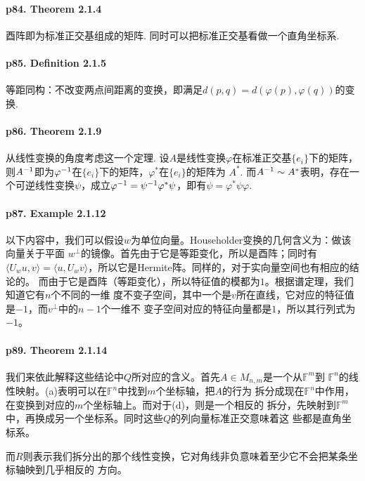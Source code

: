   \paragraph{p84. Theorem 2.1.4}
    酉阵即为标准正交基组成的矩阵. 同时可以把标准正交基看做一个直角坐标系. 

  \paragraph{p85. Definition 2.1.5}
    等距同构：不改变两点间距离的变换，即满足$d(p,q) =d(\varphi(p), \varphi(q))$的变换.

  \paragraph{p86. Theorem 2.1.9}
    从线性变换的角度考虑这一个定理. 设$A$是线性变换$\varphi$在标准正交基$\{e_i\}$下的矩阵，
    则$A^{-1}$即为$\varphi^{-1}$在$\{e_i\}$下的矩阵，$\varphi^*$在$\{e_i\}$的矩阵为
    $A^*$. 而$A^{-1}\sim A^*$表明，存在一个可逆线性变换$\psi$，成立$\varphi^{-1}=\psi
    ^{-1}\varphi^*\psi$，即有$\psi=\varphi^*\psi\varphi$. 

  \paragraph{p87. Example 2.1.12}
    以下内容中，我们可以假设$w$为单位向量。Householder变换的几何含义为：做该向量关于平面
    $w^\perp$的镜像。首先由于它是等距变化，所以是酉阵；同时有$\langle U_wu,v\rangle = 
    \langle u,U_wv\rangle$，所以它是Hermite阵。同样的，对于实向量空间也有相应的结论的。
    而由于它是酉阵（等距变化），所以特征值的模都为$1$。根据谱定理，我们知道它有$n$个不同的一维
    度不变子空间，其中一个是$v$所在直线，它对应的特征值是$-1$，而$v^\perp$中的$n-1$个一维不
    变子空间对应的特征向量都是$1$，所以其行列式为$-1$。

  \paragraph{p89. Theorem 2.1.14}
    我们来依此解释这些结论中$Q$所对应的含义。首先$A\in M_{n,m}$是一个从$\mathbb{F}^m$到
    $\mathbb{F}^n$的线性映射。(a)表明可以在$\mathbb{F}^n$中找到$m$个坐标轴，把$A$的行为
    拆分成现在$\mathbb{F}^n$中作用，在变换到对应的$m$个坐标轴上。而对于(d)，则是一个相反的
    拆分，先映射到$\mathbb{F}^m$中，再换成另一个坐标系。同时这些$Q$的列向量标准正交意味着这
    些都是直角坐标系。\par
    而$R$则表示我们拆分出的那个线性变换，它对角线非负意味着至少它不会把某条坐标轴映到几乎相反的
    方向。

